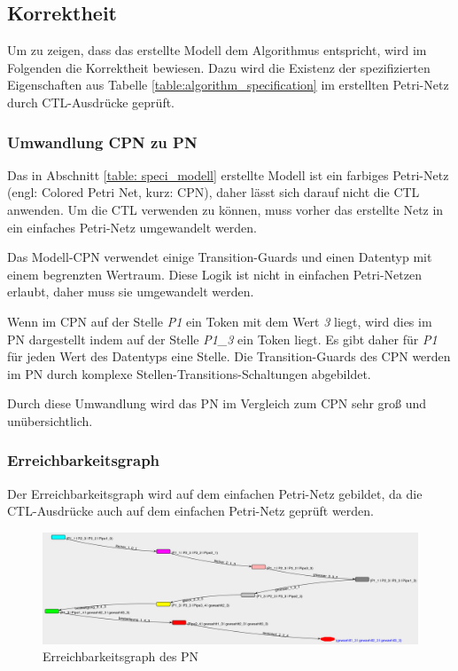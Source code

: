 \subsection{Korrektheit}
Um zu zeigen, dass das erstellte Modell dem Algorithmus entspricht, wird im Folgenden die Korrektheit bewiesen. Dazu wird die Existenz der spezifizierten Eigenschaften aus Tabelle \ref{table:algorithm_specification} im erstellten Petri-Netz durch CTL-Ausdrücke geprüft.

\subsubsection{Umwandlung CPN zu PN}
Das in Abschnitt \ref{table: speci_modell} erstellte Modell ist ein farbiges Petri-Netz (engl: Colored Petri Net, kurz: CPN), daher lässt sich darauf nicht die CTL anwenden. Um die CTL verwenden zu können, muss vorher das erstellte Netz in ein einfaches Petri-Netz umgewandelt werden.

Das Modell-CPN verwendet einige Transition-Guards und einen Datentyp mit einem begrenzten Wertraum. Diese Logik ist nicht in einfachen Petri-Netzen erlaubt, daher muss sie umgewandelt werden.

Wenn im CPN auf der Stelle \textit{P1} ein Token mit dem Wert \textit{3} liegt, wird dies im PN dargestellt indem auf der Stelle \textit{P1\_3} ein Token liegt. Es gibt daher für \textit{P1} für jeden Wert des Datentyps eine Stelle. Die Transition-Guards des CPN werden im PN durch komplexe Stellen-Transitions-Schaltungen abgebildet.

Durch diese Umwandlung wird das PN im Vergleich zum CPN sehr groß und unübersichtlich.

\subsubsection{Erreichbarkeitsgraph}
Der Erreichbarkeitsgraph wird auf dem einfachen Petri-Netz gebildet, da die CTL-Ausdrücke auch auf dem einfachen Petri-Netz geprüft werden.

\begin{figure}[H]
\centering
\includegraphics[width=1\linewidth]{img/reachibility_graph}
\caption{Erreichbarkeitsgraph des PN}
\label{fig:reachibility_graph}
\end{figure}

